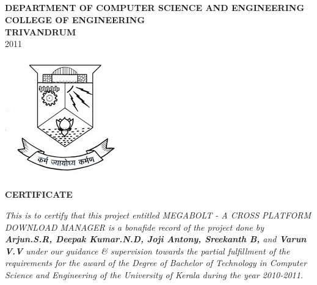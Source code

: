 \documentclass[pdftex,12pt,a4paper,pdfencoding=unicode]{article}
\begin{document}
\begin{onehalfspace}
  \section*{}
  \thispagestyle{empty}
  \begin{center}
    {\large \bf DEPARTMENT OF COMPUTER SCIENCE AND ENGINEERING}\\
    {\small \bf COLLEGE OF ENGINEERING}\\
    {\small \bf TRIVANDRUM}\\
    {\small 2011}\\
    \vspace{5mm}
    \includegraphics[scale=0.75]{pic/cetemblem.jpg}\\
                    {\large \bf CERTIFICATE}\\[0.75cm]
  \end{center}
      {\it This is to certify that this project entitled {\textsc MEGABOLT - A CROSS PLATFORM DOWNLOAD MANAGER} 
        is a bonafide record of the project done by {\bf \emph{Arjun.S.R, Deepak Kumar.N.D, Joji Antony, Sreekanth B,}} 
        and {\bf \emph{Varun V.V}} under our guidance \& supervision towards the partial fulfillment of the requirements 
        for the award of the Degree of Bachelor of Technology in Computer Science and Engineering of the University of 
        Kerala during the year 2010-2011.}
      

\end{onehalfspace}
\end{document}
